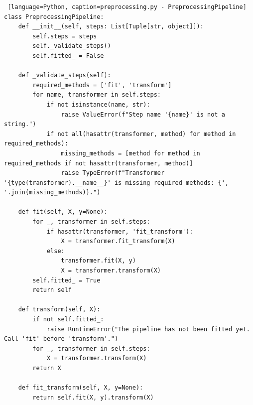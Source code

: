 \documentclass[letterpaper,10pt]{article}
\begin{document}
\begin{lstlisting} [language=Python, caption=preprocessing.py - PreprocessingPipeline] 
class PreprocessingPipeline:
    def __init__(self, steps: List[Tuple[str, object]]):
        self.steps = steps
        self._validate_steps()
        self.fitted_ = False

    def _validate_steps(self):
        required_methods = ['fit', 'transform']
        for name, transformer in self.steps:
            if not isinstance(name, str):
                raise ValueError(f"Step name '{name}' is not a string.")
            if not all(hasattr(transformer, method) for method in required_methods):
                missing_methods = [method for method in required_methods if not hasattr(transformer, method)]
                raise TypeError(f"Transformer '{type(transformer).__name__}' is missing required methods: {', '.join(missing_methods)}.")

    def fit(self, X, y=None):
        for _, transformer in self.steps:
            if hasattr(transformer, 'fit_transform'):
                X = transformer.fit_transform(X)
            else:
                transformer.fit(X, y)
                X = transformer.transform(X)
        self.fitted_ = True
        return self

    def transform(self, X):
        if not self.fitted_:
            raise RuntimeError("The pipeline has not been fitted yet. Call 'fit' before 'transform'.")
        for _, transformer in self.steps:
            X = transformer.transform(X)
        return X

    def fit_transform(self, X, y=None):
        return self.fit(X, y).transform(X)

\end{lstlisting}
\end{document}
